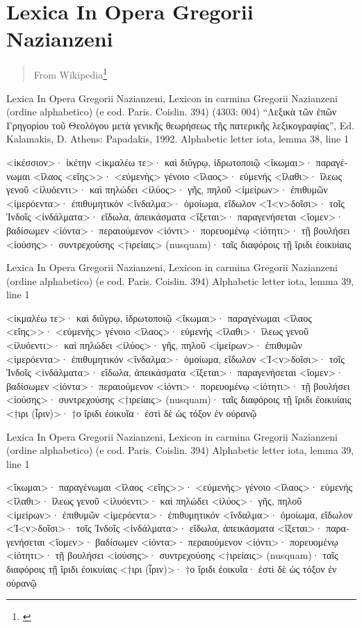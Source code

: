 \documentclass[12pt,letterpaper,twoside,final]{memoir}
\begin{document}
\section{Lexica In Opera Gregorii Nazianzeni}
\blockquote[From Wikipedia\footnote{\url{}}]{}
\begin{greek}


Lexica In Opera Gregorii Nazianzeni, Lexicon in carmina Gregorii Nazianzeni (ordine alphabetico) (e cod. Paris. Coislin. 394) (4303: 004)
“Λεξικὰ τῶν ἐπῶν Γρηγορίου τοῦ Θεολόγου μετὰ γενικῆς θεωρήσεως τῆς πατερικῆς λεξικογραφίας”, Ed. Kalamakis, D.
Athens: Papadakis, 1992.
Alphabetic letter iota, lemma 38, line 1

<ἱκέσσιον>· ἱκέτην 
<ἰκμαλέω τε>· καὶ διΰγρῳ, ἱδρωτοποιῷ 
<ἵκωμαι>· παραγένωμαι 
<ἵλαος <εἴης>>· <εὐμενὴς> γένοιο 
<ἵλαος>· εὐμενής 
<ἵλαθι>· ἵλεως γενοῦ   
<ἰλυόεντι>· καὶ πηλώδει 
<ἰλύος>· γῆς, πηλοῦ 
<ἱμείρων>· ἐπιθυμῶν 
<ἱμερόεντα>· ἐπιθυμητικόν 
<ἴνδαλμα>· ὁμοίωμα, εἴδωλον 
<Ἰ<ν>δοῖσι>· τοῖς Ἰνδοῖς 
<ἰνδάλματα>· εἴδωλα, ἀπεικάσματα 
<ἵξεται>· παραγενήσεται 
<ἴομεν>· βαδίσωμεν 
<ἰόντα>· περαιούμενον 
<ἰόντι>· πορευομένῳ 
<ἰότητι>· τῇ βουλήσει 
<ἰούσης>· συντρεχούσης 
<†ιρείαις> (nusquam)· ταῖς διαφόροις τῇ ἴριδι ἐοικυίαις 




Lexica In Opera Gregorii Nazianzeni, Lexicon in carmina Gregorii Nazianzeni (ordine alphabetico) (e cod. Paris. Coislin. 394) 
Alphabetic letter iota, lemma 39, line 1

<ἰκμαλέω τε>· καὶ διΰγρῳ, ἱδρωτοποιῷ 
<ἵκωμαι>· παραγένωμαι 
<ἵλαος <εἴης>>· <εὐμενὴς> γένοιο 
<ἵλαος>· εὐμενής 
<ἵλαθι>· ἵλεως γενοῦ   
<ἰλυόεντι>· καὶ πηλώδει 
<ἰλύος>· γῆς, πηλοῦ 
<ἱμείρων>· ἐπιθυμῶν 
<ἱμερόεντα>· ἐπιθυμητικόν 
<ἴνδαλμα>· ὁμοίωμα, εἴδωλον 
<Ἰ<ν>δοῖσι>· τοῖς Ἰνδοῖς 
<ἰνδάλματα>· εἴδωλα, ἀπεικάσματα 
<ἵξεται>· παραγενήσεται 
<ἴομεν>· βαδίσωμεν 
<ἰόντα>· περαιούμενον 
<ἰόντι>· πορευομένῳ 
<ἰότητι>· τῇ βουλήσει 
<ἰούσης>· συντρεχούσης 
<†ιρείαις> (nusquam)· ταῖς διαφόροις τῇ ἴριδι ἐοικυίαις 
<†ιρι (ἶριν)>· †ο ἴριδι ἐοικυῖα· ἐστὶ δὲ ὡς τόξον ἐν οὐρανῷ 




Lexica In Opera Gregorii Nazianzeni, Lexicon in carmina Gregorii Nazianzeni (ordine alphabetico) (e cod. Paris. Coislin. 394) 
Alphabetic letter iota, lemma 39, line 1

<ἵκωμαι>· παραγένωμαι 
<ἵλαος <εἴης>>· <εὐμενὴς> γένοιο 
<ἵλαος>· εὐμενής 
<ἵλαθι>· ἵλεως γενοῦ   
<ἰλυόεντι>· καὶ πηλώδει 
<ἰλύος>· γῆς, πηλοῦ 
<ἱμείρων>· ἐπιθυμῶν 
<ἱμερόεντα>· ἐπιθυμητικόν 
<ἴνδαλμα>· ὁμοίωμα, εἴδωλον 
<Ἰ<ν>δοῖσι>· τοῖς Ἰνδοῖς 
<ἰνδάλματα>· εἴδωλα, ἀπεικάσματα 
<ἵξεται>· παραγενήσεται 
<ἴομεν>· βαδίσωμεν 
<ἰόντα>· περαιούμενον 
<ἰόντι>· πορευομένῳ 
<ἰότητι>· τῇ βουλήσει 
<ἰούσης>· συντρεχούσης 
<†ιρείαις> (nusquam)· ταῖς διαφόροις τῇ ἴριδι ἐοικυίαις 
<†ιρι (ἶριν)>· †ο ἴριδι ἐοικυῖα· ἐστὶ δὲ ὡς τόξον ἐν οὐρανῷ 

\end{greek}

\printbibliography

\printindex
\end{document}
